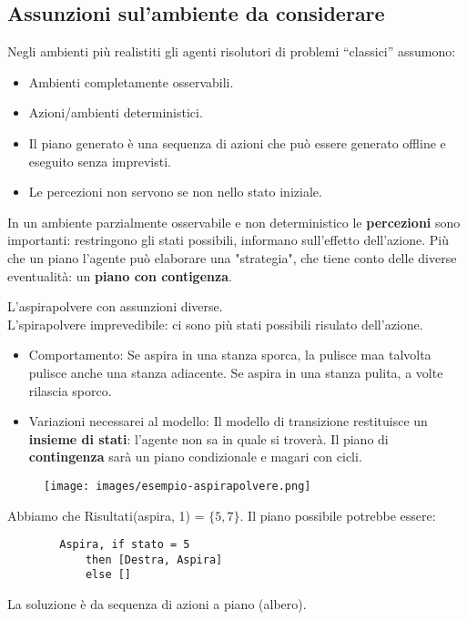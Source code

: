 \subsection{Assunzioni sul'ambiente da considerare}
Negli ambienti più realistiti gli agenti risolutori di problemi “classici” assumono:
\begin{itemize}
    \item Ambienti completamente osservabili.
    \item Azioni/ambienti deterministici.
    \item Il piano generato è una sequenza di azioni che può essere generato offline e eseguito senza imprevisti.
    \item Le percezioni non servono se non nello stato iniziale.
\end{itemize}
In un ambiente parzialmente osservabile e non deterministico le \textbf{percezioni} sono importanti: restringono gli stati possibili, informano sull’effetto dell’azione.
Più che un piano l'agente può elaborare una "strategia", che tiene conto delle diverse eventualità: un \textbf{piano con contigenza}.
\begin{example}
    L'aspirapolvere con assunzioni diverse. \\
    L'spirapolvere imprevedibile: ci sono più stati possibili risulato dell'azione.
    \begin{itemize}
        \item Comportamento: Se aspira in una stanza sporca, la pulisce maa talvolta pulisce anche una stanza adiacente. Se aspira in una stanza pulita, a volte rilascia sporco.
        \item Variazioni necessarei al modello: Il modello di transizione restituisce un \textbf{insieme di stati}: l'agente non sa in quale si troverà. Il piano di \textbf{contingenza} sarà un piano condizionale e magari con cicli.
    \end{itemize}
    \begin{figure}[h!]
        \centering
        \texttt{[image: images/esempio-aspirapolvere.png]}
    \end{figure}
    \newpage
    Abbiamo che Risultati(aspira, 1) = $\{5, 7\}$. Il piano possibile potrebbe essere:
    \begin{lstlisting}
        Aspira, if stato = 5 
            then [Destra, Aspira]
            else []
    \end{lstlisting}
    La soluzione è da sequenza di azioni a piano (albero).
\end{example}
